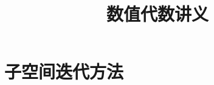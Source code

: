 \documentclass{book}
\begin{document}
\title{数值代数讲义}
\maketitle

\chapter{子空间迭代方法}


\cite{stein2003}


\end{document}
